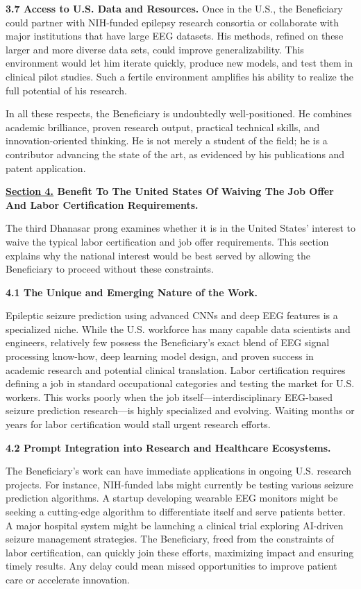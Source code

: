 \documentclass{article}
\begin{document}
{\bf 3.7 Access to U.S. Data and Resources.}
Once in the U.S., the Beneficiary could partner with NIH-funded epilepsy research consortia or collaborate with major institutions that have large EEG datasets. His methods, refined on these larger and more diverse data sets, could improve generalizability. This environment would let him iterate quickly, produce new models, and test them in clinical pilot studies. Such a fertile environment amplifies his ability to realize the full potential of his research.

In all these respects, the Beneficiary is undoubtedly well-positioned. He combines academic brilliance, proven research output, practical technical skills, and innovation-oriented thinking. He is not merely a student of the field; he is a contributor advancing the state of the art, as evidenced by his publications and patent application.


\clearpage

{\bf \underline{Section 4.} Benefit To The United States Of Waiving The Job Offer And Labor Certification Requirements. }

The third Dhanasar prong examines whether it is in the United States’ interest to waive the typical labor certification and job offer requirements. This section explains why the national interest would be best served by allowing the Beneficiary to proceed without these constraints.

{\bf 4.1 The Unique and Emerging Nature of the Work.}

Epileptic seizure prediction using advanced CNNs and deep EEG features is a specialized niche. While the U.S. workforce has many capable data scientists and engineers, relatively few possess the Beneficiary’s exact blend of EEG signal processing know-how, deep learning model design, and proven success in academic research and potential clinical translation. Labor certification requires defining a job in standard occupational categories and testing the market for U.S. workers. This works poorly when the job itself—interdisciplinary EEG-based seizure prediction research—is highly specialized and evolving. Waiting months or years for labor certification would stall urgent research efforts.

{\bf 4.2 Prompt Integration into Research and Healthcare Ecosystems.}

The Beneficiary’s work can have immediate applications in ongoing U.S. research projects. For instance, NIH-funded labs might currently be testing various seizure prediction algorithms. A startup developing wearable EEG monitors might be seeking a cutting-edge algorithm to differentiate itself and serve patients better. A major hospital system might be launching a clinical trial exploring AI-driven seizure management strategies. The Beneficiary, freed from the constraints of labor certification, can quickly join these efforts, maximizing impact and ensuring timely results. Any delay could mean missed opportunities to improve patient care or accelerate innovation.
\end{document}
